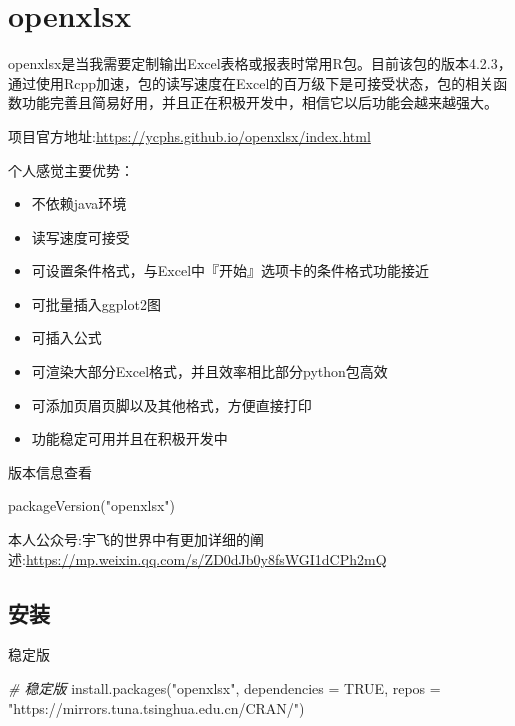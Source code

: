 \documentclass[
]{book}
\newenvironment{Shaded}{\begin{snugshade}}{\end{snugshade}}
\newcommand{\AttributeTok}[1]{\textcolor[rgb]{0.77,0.63,0.00}{#1}}
\newcommand{\CommentTok}[1]{\textcolor[rgb]{0.56,0.35,0.01}{\textit{#1}}}
\newcommand{\ConstantTok}[1]{\textcolor[rgb]{0.00,0.00,0.00}{#1}}
\newcommand{\FunctionTok}[1]{\textcolor[rgb]{0.00,0.00,0.00}{#1}}
\newcommand{\NormalTok}[1]{#1}
\newcommand{\StringTok}[1]{\textcolor[rgb]{0.31,0.60,0.02}{#1}}
\providecommand{\tightlist}{%
  \setlength{\itemsep}{0pt}\setlength{\parskip}{0pt}}
\begin{document}
\hypertarget{openxlsx:description}{%
\section{openxlsx}\label{openxlsx:description}}

openxlsx是当我需要定制输出Excel表格或报表时常用R包。目前该包的版本4.2.3，通过使用Rcpp加速，包的读写速度在Excel的百万级下是可接受状态，包的相关函数功能完善且简易好用，并且正在积极开发中，相信它以后功能会越来越强大。

项目官方地址:\url{https://ycphs.github.io/openxlsx/index.html}

个人感觉主要优势：

\begin{itemize}
\tightlist
\item
  不依赖java环境
\item
  读写速度可接受
\item
  可设置条件格式，与Excel中『开始』选项卡的条件格式功能接近
\item
  可批量插入ggplot2图
\item
  可插入公式
\item
  可渲染大部分Excel格式，并且效率相比部分python包高效
\item
  可添加页眉页脚以及其他格式，方便直接打印
\item
  功能稳定可用并且在积极开发中
\end{itemize}

版本信息查看

\begin{Shaded}
\begin{Highlighting}[]
\FunctionTok{packageVersion}\NormalTok{(}\StringTok{"openxlsx"}\NormalTok{)}
\end{Highlighting}
\end{Shaded}

本人公众号:宇飞的世界中有更加详细的阐述:\url{https://mp.weixin.qq.com/s/ZD0dJb0y8fsWGI1dCPh2mQ}

\hypertarget{openxlsx:install}{%
\subsection{安装}\label{openxlsx:install}}

稳定版

\begin{Shaded}
\begin{Highlighting}[]
\CommentTok{\# 稳定版}
\FunctionTok{install.packages}\NormalTok{(}\StringTok{"openxlsx"}\NormalTok{, }\AttributeTok{dependencies =} \ConstantTok{TRUE}\NormalTok{, }\AttributeTok{repos =} \StringTok{"https://mirrors.tuna.tsinghua.edu.cn/CRAN/"}\NormalTok{)}
\end{Highlighting}
\end{Shaded}
\end{document}
